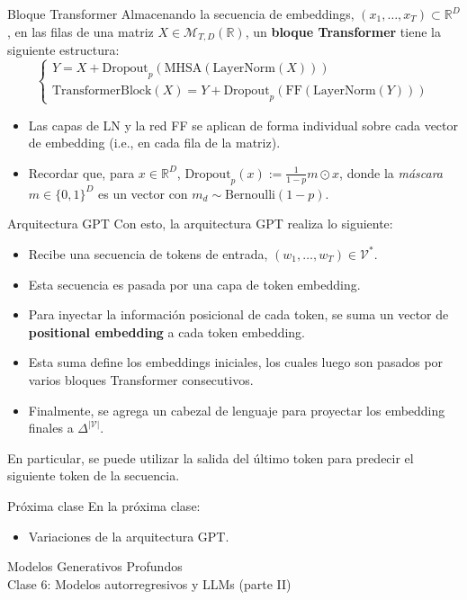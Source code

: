 \documentclass{beamer}
\newcommand{\R}{\mathbb{R}}
\begin{document}
\begin{frame}{Bloque Transformer}
    Almacenando la secuencia de embeddings, $(x_1,\ldots,x_T)\subset\R^D$, en las filas de una matriz $X\in\mathcal{M}_{T,D}(\R)$, un \textbf{bloque Transformer} tiene la siguiente estructura:
    \begin{equation*}
        \begin{cases}
            Y=X+\text{Dropout}_p(\text{MHSA}(\text{LayerNorm}(X))) \\
            \text{TransformerBlock}(X) = Y + \text{Dropout}_p(\text{FF}(\text{LayerNorm}(Y)))
        \end{cases}
    \end{equation*}
    \vspace{-0.5cm}
    \begin{itemize}
        \item Las capas de LN y la red FF se aplican de forma individual sobre cada vector de embedding (i.e., en cada fila de la matriz).
        \item Recordar que, para $x\in\R^D$, $\text{Dropout}_p(x):=\frac{1}{1-p}m\odot x$, donde la \textit{máscara} $m\in\{0,1\}^D$ es un vector con $m_d\sim\text{Bernoulli}(1-p)$.
    \end{itemize}
\end{frame}

\begin{frame}{Arquitectura GPT}
    Con esto, la arquitectura GPT realiza lo siguiente:
    \begin{itemize}
        \item Recibe una secuencia de tokens de entrada, $(w_1,\ldots,w_T)\in\mathcal{V}^*$.
        \item Esta secuencia es pasada por una capa de token embedding.
        \item Para inyectar la información posicional de cada token, se suma un vector de \textbf{positional embedding} a cada token embedding.
        \item Esta suma define los embeddings iniciales, los cuales luego son pasados por varios bloques Transformer consecutivos.
        \item Finalmente, se agrega un cabezal de lenguaje para proyectar los embedding finales a $\Delta^{|\mathcal{V}|}$.
    \end{itemize}
    En particular, se puede utilizar la salida del último token para predecir el siguiente token de la secuencia.
\end{frame}

\begin{frame}{Próxima clase}
    En la próxima clase:
    \begin{itemize}
        \item Variaciones de la arquitectura GPT.
    \end{itemize}
\end{frame}

\begin{frame}
    \centering
    \Large{Modelos Generativos Profundos}\\
    \large{Clase 6: Modelos autorregresivos y LLMs (parte II)}
\end{frame}
\end{document}
